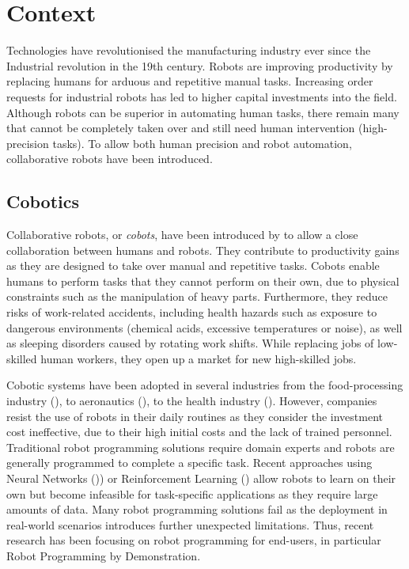 \section{Context}
Technologies have revolutionised the manufacturing industry ever since the Industrial revolution in the 19th century.
Robots are improving productivity by replacing humans for arduous and repetitive manual tasks.
Increasing order requests for industrial robots has led to higher capital investments into the field.
Although robots can be superior in automating human tasks, there remain many that cannot be completely taken over and still need human intervention (\eg high-precision tasks).
To allow both human precision and robot automation, collaborative robots have been introduced.

\subsection{Cobotics}\label{subsec:Cobotics}
Collaborative robots, or \textit{cobots}, have been introduced by \cite{colgate1999cobots} to allow a close collaboration between humans and robots.
They contribute to productivity gains as they are designed to take over manual and repetitive tasks.
Cobots enable humans to perform tasks that they cannot perform on their own, due to physical constraints such as the manipulation of heavy parts.
Furthermore, they reduce risks of work-related accidents, including health hazards such as exposure to dangerous environments (\eg chemical acids, excessive temperatures or noise), as well as sleeping disorders caused by rotating work shifts.
While replacing jobs of low-skilled human workers, they open up a market for new high-skilled jobs.

Cobotic systems have been adopted in several industries from the food-processing industry (\cite{Food}), to aeronautics (\cite{Airbus}), to the health industry (\cite{Ebola}).
However, companies resist the use of robots in their daily routines as they consider the investment cost ineffective, due to their high initial costs and the lack of trained personnel.
Traditional robot programming solutions require domain experts and robots are generally programmed to complete a specific task.
Recent approaches using Neural Networks (\cite{billard2001robust})) or Reinforcement Learning (\cite{smart2002effective}) allow robots to learn on their own but become infeasible for task-specific applications as they require large amounts of data.
Many robot programming solutions fail as the deployment in real-world scenarios introduces further unexpected limitations. 
Thus, recent research has been focusing on robot programming for end-users, in particular Robot Programming by Demonstration.

